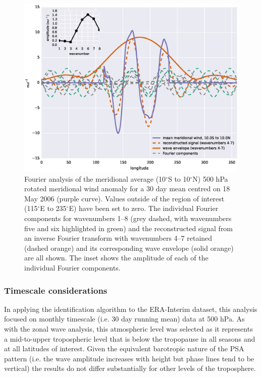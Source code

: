 \begin{figure}
\begin{center}
\includegraphics[width=0.84\columnwidth]{figures/psa/Figure4-2.eps}
\caption[Fourier analysis of the meridional average (10$^{\circ}$S to 10$^{\circ}$N) 500 hPa rotated meridional wind anomaly for a 30 day mean centred on 18 May 2006]{\label{fig:transform}
Fourier analysis of the meridional average (10$^{\circ}$S to 10$^{\circ}$N) 500 hPa rotated meridional wind anomaly for a 30 day mean centred on 18 May 2006 (purple curve). Values outside of the region of interest (115$^{\circ}$E to 235$^{\circ}$E) have been set to zero. The individual Fourier components for wavenumbers 1--8 (grey dashed, with wavenumbers five and six highlighted in green) and the reconstructed signal from an inverse Fourier transform with wavenumbers 4--7 retained (dashed orange) and its corresponding wave envelope (solid orange) are all shown. The inset shows the amplitude of each of the individual Fourier components.
}
\end{center}
\end{figure}

\subsubsection{Timescale considerations}

In applying the identification algorithm to the ERA-Interim dataset, this analysis focused on monthly timescale (i.e. 30 day running mean) data at 500 hPa. As with the zonal wave analysis, this atmospheric level was selected as it represents a mid-to-upper tropospheric level that is below the tropopause in all seasons and at all latitudes of interest. Given the equivalent barotropic nature of the PSA pattern (i.e. the wave amplitude increases with height but phase lines tend to be vertical) the results do not differ substantially for other levels of the troposphere. 

